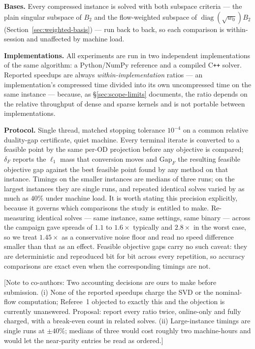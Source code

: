 \documentclass[11pt]{article}
\newif\ifshownotes \shownotestrue
\newcommand{\conote}[1]{\ifshownotes{\color{red}\small\textsf{[Note to co-authors: #1]}}\fi}
\begin{document}
\textbf{Bases.} Every compressed instance is solved with both subspace criteria --- the plain
singular subspace of $B_2$ and the flow-weighted subspace of
$\operatorname{diag}(\sqrt{w_0})B_2$ (Section~\ref{sec:weighted-basis}) --- run back to back, so
each comparison is within-session and unaffected by machine load.

\textbf{Implementations.} All experiments are run in two independent implementations of the
same algorithm: a Python/NumPy reference and a compiled C\texttt{++} solver. Reported
speedups are always \emph{within-implementation} ratios --- an implementation's compressed
time divided into its own uncompressed time on the same instance --- because, as
\S\ref{sec:scope-limits} documents, the ratio depends on the relative throughput of dense and
sparse kernels and is not portable between implementations.

\textbf{Protocol.} Single thread, matched stopping tolerance $10^{-4}$ on a common relative
duality-gap certificate, quiet machine. Every terminal iterate is converted to a feasible
point by the same per-OD projection before any objective is compared; $\delta_F$ reports the
$\ell_1$ mass that conversion moves and $\mathrm{Gap}_F$ the resulting feasible objective
gap against the best feasible point found by any method on that instance. Timings on the
smaller instances are medians of three runs; on the largest instances they are single runs,
and repeated identical solves varied by as much as $40\%$ under machine load. It is worth
stating this precision explicitly, because it governs which comparisons the study is entitled
to make. Re-measuring identical solves --- same instance, same settings, same binary --- across
the campaign gave spreads of $1.1$ to $1.6\times$ typically and $2.8\times$ in the worst case,
so we treat $1.45\times$ as a conservative noise floor and read no speed difference smaller
than that as an effect. Feasible objective gaps carry no such caveat: they are deterministic
and reproduced bit for bit across every repetition, so accuracy comparisons are exact even when
the corresponding timings are not.

\conote{Two accounting decisions are ours to make before submission. (i) None of the reported
speedups charge the SVD or the nominal-flow computation; Referee~1 objected to exactly this
and the objection is currently unanswered. Proposal: report every ratio twice, online-only and
fully charged, with a break-even count in related solves. (ii) Large-instance timings are
single runs at $\pm40\%$; medians of three would cost roughly two machine-hours and would let
the near-parity entries be read as ordered.}
\end{document}
